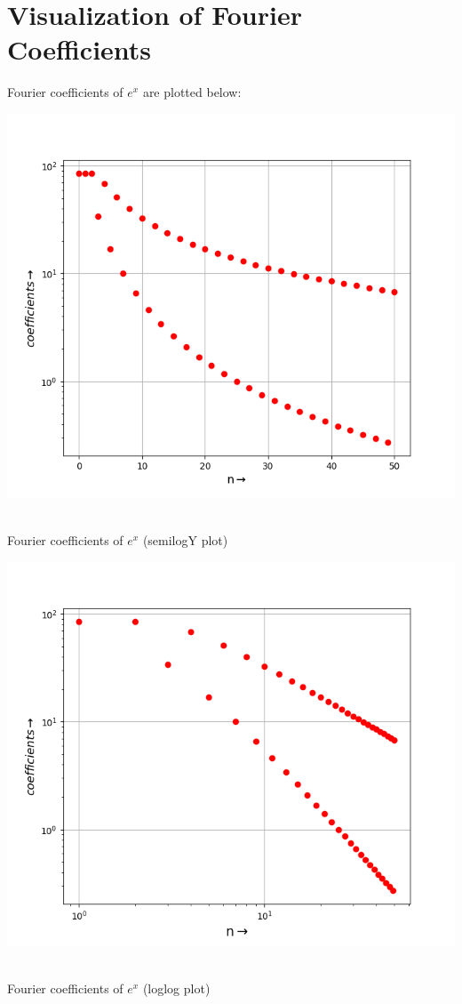 \documentclass[12pt, a4paper]{report}
\begin{document}
\section*{Visualization of Fourier Coefficients}
Fourier coefficients of $e^x$ are plotted below:
\begin{center}
	\includegraphics[scale=0.65]{Figure_3} 
	\caption{\\Fourier coefficients of $e^x$ (semilogY plot)}
	\label{fig:rawdata}
\end{center}
\begin{center}
	\includegraphics[scale=0.65]{Figure_4} 
	\caption{\\Fourier coefficients of $e^x$ (loglog plot)}
	\label{fig:rawdata}
\end{center}
\end{document}

